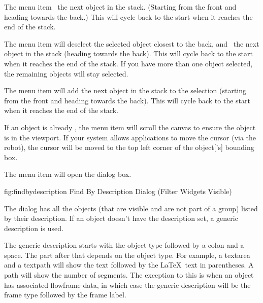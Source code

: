 
The  menu item 
\selects\ the next \gls{object} in the \gls{stack}. (Starting from the
\gls{front} and heading towards the \gls{back}.) This will cycle back to
the start when it reaches the end of the \gls{stack}.


The  menu item will deselect the
selected \gls{object} closest to the \gls{back}, and \select\
the next \gls{object} in the \gls{stack} (heading towards the \gls{back}). This
will cycle back to the start when it reaches the end of the stack.
If you have more than one \gls{object} selected, the remaining
\glspl*{object} will stay selected.


The  menu item will add
the next \gls{object} in the \gls{stack} to the selection (starting from
the \gls{front} and heading towards the \gls{back}). This will cycle back to
the start when it reaches the end of the stack.


If an \gls{object} is already \selected, the 
menu item will scroll the \gls{canvas} to ensure the \gls{object} is
in the viewport. If your system allows applications to move the
cursor (via the \gls{robot}), the cursor will be moved to the top left corner of the
\gls{object}['s] bounding box.


%
The  menu item will open the
 dialog box. 


\FloatFig
 {fig:findbydescription}
 {}
 {Find By Description Dialog (Filter Widgets Visible)}

The  dialog has all the
\glspl{object} (that are visible and are not part of a \gls{group}) listed by their
description.  If an object doesn't have the description set, a
generic description is used. 

The generic description starts with the object type followed by a
colon and a space. The part after that depends on the object type.
For example, a \gls{textarea} and a \gls{textpath} will show the
text followed by the \LaTeX\ text in parentheses. A path will show
the number of segments. The exception to this is when an object has
associated \gls{flowframe} data, in which case the generic
description will be the frame type followed by the frame label.

